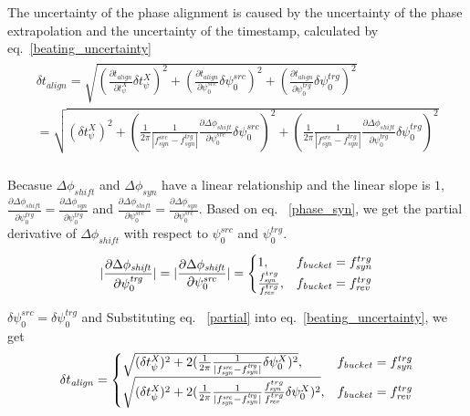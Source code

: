 \begin{itemize}
The uncertainty of the phase alignment is caused by the uncertainty of the phase extrapolation and the uncertainty of the timestamp, calculated by eq.~\ref{beating_uncertainty}
\begin{eqnarray}
\begin{aligned}
\delta t_\mathit{align} =\sqrt {(\frac {\partial t_\mathit{align}}{\partial t_\psi^\mathit{X}} \delta t_\psi^\mathit{X})^2 +(\frac {\partial t_\mathit{align}}{\partial \psi^\mathit{src}_0} \delta\psi^\mathit{src}_0)^2+(\frac {\partial t_\mathit{align}}{\partial \psi^\mathit{trg}_0} \delta\psi^\mathit{trg}_0)^2  }\\
=\sqrt {(\delta t_\psi^\mathit{X})^2 +(\frac{1}{2\pi}\frac{1}{|f_{\mathit{syn}}^\mathit{src}-f_{\mathit{syn}}^\mathit{trg}|}\frac {\partial \Delta \phi_\mathit{shift}}{\partial \psi^\mathit{src}_0}  \delta  \psi^\mathit{src}_0)^2 +(\frac{1}{2\pi}\frac{1}{|f_{\mathit{syn}}^\mathit{src}-f_{\mathit{syn}}^\mathit{trg}|}\frac {\partial \Delta \phi_\mathit{shift}}{\partial \psi^\mathit{trg}_0}  \delta  \psi^\mathit{trg}_0)^2}\\
\label{beating_uncertainty}
\end{aligned}
\end{eqnarray}

Becasue $\Delta \phi_\mathit{shift}$ and $\Delta \phi_\mathit{syn}$ have a linear relationship and the linear slope is $1$, $\frac {\partial \Delta \phi_\mathit{shift}}{\partial \psi^\mathit{trg}_0}=\frac {\partial \Delta \phi_\mathit{syn}}{\partial \psi^\mathit{trg}_0}$ and $\frac {\partial \Delta \phi_\mathit{shift}}{\partial \psi^\mathit{src}_0}=\frac {\partial \Delta \phi_\mathit{syn}}{\partial \psi^\mathit{src}_0}$. Based on eq. ~\ref{phase_syn}, we get the partial derivative of $\Delta \phi_\mathit{shift}$ with respect to $\psi^\mathit{src}_0$ and $\psi^\mathit{trg}_0$.
\begin{eqnarray}\label{partial}
|\frac {\partial \Delta \phi_\mathit{shift}}{\partial \psi^\mathit{trg}_0}| = |\frac {\partial \Delta \phi_\mathit{shift}}{\partial \psi^\mathit{src}_0}|=
\begin{cases}
1, &f_{\mathit{bucket}}=f_{\mathit{syn}}^{trg}\cr
\frac{f_{\mathit{syn}}^{trg}}{f_{\mathit{rev}}^{trg}}, &f_{\mathit{bucket}}=f_{\mathit{rev}}^{trg}\cr
\end{cases}
\end{eqnarray}

$\delta  \psi^\mathit{src}_0=\delta  \psi^\mathit{trg}_0$ and Substituting eq. ~\ref{partial} into eq.~\ref{beating_uncertainty}, we get 
\begin{eqnarray}
\delta t_\mathit{align}=
\begin{cases}
\sqrt {(\delta t_\psi^\mathit{X})^2 +2(\frac{1}{2\pi}\frac{1}{|f_{\mathit{syn}}^\mathit{src}-f_{\mathit{syn}}^\mathit{trg}|} \delta  \psi^{X}_0)^2 }, &f_{\mathit{bucket}}=f_{\mathit{syn}}^{trg}\cr
\sqrt {(\delta t_\psi^\mathit{X})^2 +2(\frac{1}{2\pi}\frac{1}{|f_{\mathit{syn}}^\mathit{src}-f_{\mathit{syn}}^\mathit{trg}|} \frac{f_{\mathit{syn}}^{trg}}{f_{\mathit{rev}}^{trg}}\delta  \psi^{X}_0)^2 }, &f_{\mathit{bucket}}=f_{\mathit{rev}}^{trg}\cr
\end{cases}
\end{eqnarray}


\end{itemize}
